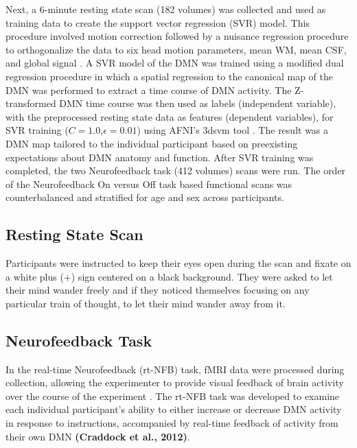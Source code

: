 Next, a 6-minute resting state scan (182 volumes) was collected and used as training data to create the support vector regression (SVR) model. This procedure involved motion correction followed by a nuisance regression procedure to orthogonalize the data to six head motion parameters, mean WM, mean CSF, and global signal \cite{Fox_2005,Friston_1996,Lund_2006}. A SVR model of the DMN was trained using a modified dual regression procedure in which a spatial regression to the canonical map of the DMN was performed to extract a time course of DMN activity. The Z-transformed DMN time course was then used as labels (independent variable), with the preprocessed resting state data as features (dependent variables), for SVR training ($C=1.0$,$ \epsilon = 0.01$) using AFNI's 3dsvm tool \cite{Laconte_2005}. The result was a DMN map tailored to the individual participant based on preexisting expectations about DMN anatomy and function. After SVR training was completed, the two Neurofeedback task (412 volumes) scans were run.  The order of the Neurofeedback On versus Off task based functional scans was counterbalanced and stratified for age and sex across participants.

\subsection{Resting State Scan}

Participants were instructed to keep their eyes open during the scan and fixate on a white plus ($+$) sign centered on a black background. They were asked to let their mind wander freely and if they noticed themselves focusing on any particular train of thought, to let their mind wander away from it.

\subsection{Neurofeedback Task}

In the real-time Neurofeedback (rt-NFB) task, fMRI data were processed during collection, allowing the experimenter to provide visual feedback of brain activity over the course of the experiment \cite{Cox_1995,LaConte_2011,McDonald_2016}. The rt-NFB task was developed to examine each individual participant's ability to either increase or decrease DMN activity in response to instructions, accompanied by real-time feedback of activity from their own DMN \textbf{(Craddock et al., 2012)}.

